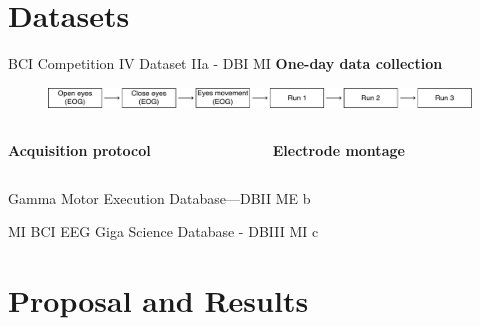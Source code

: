\documentclass[aspectratio=169]{beamer}
\begin{document}
\section{Datasets}

\begin{frame}{BCI Competition IV Dataset IIa - DBI MI}
    \textbf{One-day data collection}
    \begin{figure}[!h]
        \centering
        \includegraphics[width=\linewidth]{../Tesis_document/Figures/preliminaries/BCI2a_schema.pdf}
      \end{figure}
      \begin{columns}
            \centering
            \textbf{Acquisition protocol}
            \begin{figure}[!ht]
                \centering
                \resizebox{0.9\linewidth}{!}{}
            \end{figure}
            \centering
            \textbf{Electrode montage}
            \begin{figure}[!ht]
                \centering
            \end{figure}
    \end{columns}
\end{frame}

\begin{frame}{Gamma Motor Execution Database—DBII ME}
    b
\end{frame}

\begin{frame}{MI BCI EEG Giga Science Database - DBIII MI}
    c
\end{frame}

\section{Proposal and Results}
\end{document}
